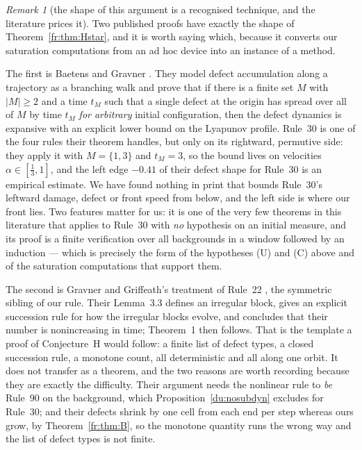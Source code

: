 \documentclass[11pt]{article}
\theoremstyle{definition}
\theoremstyle{remark}
\newtheorem{remark}[theorem]{Remark}
\begin{document}
\begin{remark}[the shape of this argument is a recognised technique, and the literature prices it]\label{fr:template}
Two published proofs have exactly the shape of Theorem~\ref{fr:thm:Hstar}, and it is worth saying which,
because it converts our saturation computations from an ad hoc device into an instance of a method.

The first is Baetens and Gravner \cite[Thm.~4.2]{BGrav}. They model defect accumulation along a
trajectory as a branching walk and prove that if there is a finite set $M$ with $|M|\ge2$ and a time
$t_M$ such that a single defect at the origin has spread over all of $M$ by time $t_M$ \emph{for
arbitrary} initial configuration, then the defect dynamics is expansive with an explicit lower bound on
the Lyapunov profile. Rule~30 is one of the four rules their theorem handles, but only on its rightward, permutive side:
they apply it with $M=\{1,3\}$ and $t_M=3$, so the bound lives on velocities $\alpha\in[\tfrac13,1]$, and the left edge
$-0.41$ of their defect shape for Rule~30 is an empirical estimate. We have found nothing in print that bounds Rule~30's
leftward damage, defect or front speed from below, and the left side is where our front lies. Two features matter for
us: it is one of the very few theorems in this literature that applies to Rule~30 with \emph{no}
hypothesis on an initial measure, and its proof is a finite verification over all backgrounds in a
window followed by an induction --- which is precisely the form of the hypotheses (U) and (C) above and
of the saturation computations that support them.

The second is Gravner and Griffeath's treatment of Rule~22 \cite{GG22}, the symmetric sibling of our
rule. Their Lemma~3.3 defines an irregular block, gives an explicit succession rule for how the
irregular blocks evolve, and concludes that their number is nonincreasing in time; Theorem~1 then
follows. That is the template a proof of Conjecture~H would follow: a finite list of defect types, a
closed succession rule, a monotone count, all deterministic and all along one orbit. It does not
transfer as a theorem, and the two reasons are worth recording because they are exactly the difficulty.
Their argument needs the nonlinear rule to \emph{be} Rule~90 on the background, which
Proposition~\ref{du:nosubdyn} excludes for Rule~30; and their defects shrink by one cell from each end
per step whereas ours grow, by Theorem~\ref{fr:thm:B}, so the monotone quantity runs the wrong way and
the list of defect types is not finite.


\end{remark}
\end{document}
